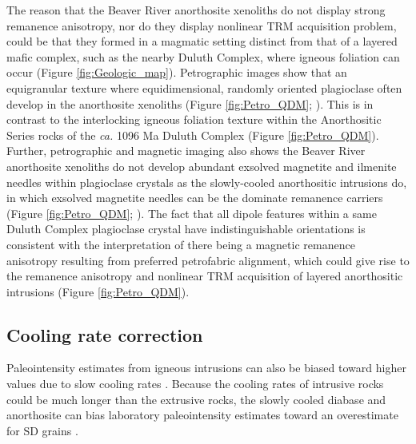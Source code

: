 \documentclass[draft]{agujournal2019}
\begin{document}
The reason that the Beaver River anorthosite xenoliths do not display strong remanence anisotropy, nor do they display nonlinear TRM acquisition problem, could be that they formed in a magmatic setting distinct from that of a layered mafic complex, such as the nearby Duluth Complex, where igneous foliation can occur (Figure \ref{fig:Geologic_map}). Petrographic images show that an equigranular texture where equidimensional, randomly oriented plagioclase often develop in the anorthosite xenoliths (Figure \ref{fig:Petro_QDM}; ). This is in contrast to the interlocking igneous foliation texture within the Anorthositic Series rocks of the \textit{ca.} 1096 Ma Duluth Complex (Figure \ref{fig:Petro_QDM}). Further, petrographic and magnetic imaging also shows the Beaver River anorthosite xenoliths do not develop abundant exsolved magnetite and ilmenite needles within plagioclase crystals as the slowly-cooled anorthositic intrusions do, in which exsolved magnetite needles can be the dominate remanence carriers (Figure \ref{fig:Petro_QDM}; ). The fact that all dipole features within a same Duluth Complex plagioclase crystal have indistinguishable orientations is consistent with the interpretation of there being a magnetic remanence anisotropy resulting from preferred petrofabric alignment, which could give rise to the remanence anisotropy and nonlinear TRM acquisition of layered anorthositic intrusions (Figure \ref{fig:Petro_QDM}). 

\subsection*{Cooling rate correction}
Paleointensity estimates from igneous intrusions can also be biased toward higher values due to slow cooling rates \cite{Halgedahl1980a}. Because the cooling rates of intrusive rocks could be much longer than the extrusive rocks, the slowly cooled diabase and anorthosite can bias laboratory paleointensity estimates toward an overestimate for SD grains \cite{Dodson1980a, Halgedahl1980a, Selkin2000a}. 
\end{document}
